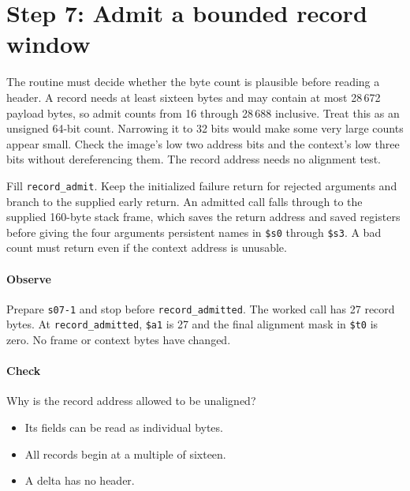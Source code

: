\section{Step 7: Admit a bounded record window}
The routine must decide whether the byte count is plausible before reading a
header. A record needs at least sixteen bytes and may contain at most 28\,672
payload bytes, so admit counts from 16 through 28\,688 inclusive. Treat this as an
unsigned 64-bit count. Narrowing it to 32 bits would make some very large counts
appear small. Check the image's low two address bits and the context's low three
bits without dereferencing them. The record address needs no alignment test.

Fill \texttt{record\_admit}. Keep the initialized failure return for rejected
arguments and branch to the supplied early return. An admitted call falls through
to the supplied 160-byte stack frame, which saves the return address and saved
registers before giving the four arguments persistent names in
\texttt{\$s0} through \texttt{\$s3}. A bad count must return even if the context
address is unusable.

\paragraph{Observe} Prepare \texttt{s07-1} and stop before
\texttt{record\_admitted}. The worked call has 27 record bytes. At \texttt{record\_admitted},
\texttt{\$a1} is 27 and the final alignment mask in \texttt{\$t0} is zero.
No frame or context bytes have changed.

\paragraph{Check} Why is the record address allowed to be unaligned?
\begin{itemize}
  \item[A.] Its fields can be read as individual bytes.
  \item[B.] All records begin at a multiple of sixteen.
  \item[C.] A delta has no header.
\end{itemize}
